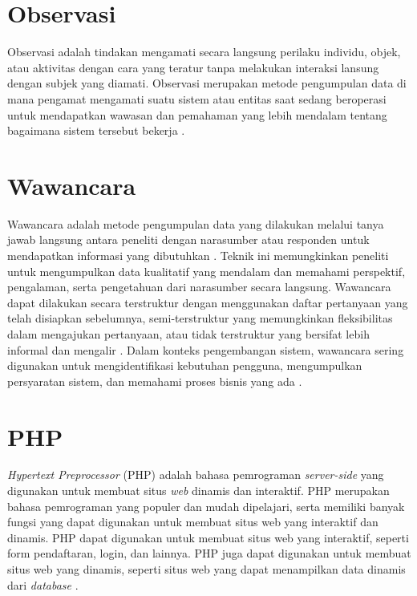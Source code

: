 \section{Observasi}
Observasi adalah tindakan mengamati secara langsung perilaku individu, objek, atau aktivitas dengan cara yang teratur tanpa melakukan interaksi lansung dengan subjek yang diamati. Observasi merupakan metode pengumpulan data di mana pengamat mengamati suatu sistem atau entitas saat sedang beroperasi untuk mendapatkan wawasan dan pemahaman yang lebih mendalam tentang bagaimana sistem tersebut bekerja \cite{tilley2017systems}.

\section{Wawancara}
Wawancara adalah metode pengumpulan data yang dilakukan melalui tanya jawab langsung antara peneliti dengan narasumber atau responden untuk mendapatkan informasi yang dibutuhkan \cite{monday2020impacts}. Teknik ini memungkinkan peneliti untuk mengumpulkan data kualitatif yang mendalam dan memahami perspektif, pengalaman, serta pengetahuan dari narasumber secara langsung. Wawancara dapat dilakukan secara terstruktur dengan menggunakan daftar pertanyaan yang telah disiapkan sebelumnya, semi-terstruktur yang memungkinkan fleksibilitas dalam mengajukan pertanyaan, atau tidak terstruktur yang bersifat lebih informal dan mengalir \cite{balza2022effective}. Dalam konteks pengembangan sistem, wawancara sering digunakan untuk mengidentifikasi kebutuhan pengguna, mengumpulkan persyaratan sistem, dan memahami proses bisnis yang ada \cite{rueda2020requirements}.

\section{PHP}
\textit{Hypertext Preprocessor} (PHP) adalah bahasa pemrograman \textit{server-side} yang digunakan untuk membuat situs \textit{web} dinamis dan interaktif. PHP merupakan bahasa pemrograman yang populer dan mudah dipelajari, serta memiliki banyak fungsi yang dapat digunakan untuk membuat situs web yang interaktif dan dinamis. PHP dapat digunakan untuk membuat situs web yang interaktif, seperti form pendaftaran, login, dan lainnya. PHP juga dapat digunakan untuk membuat situs web yang dinamis, seperti situs web yang dapat menampilkan data dinamis dari \textit{database} \cite{Cowls2021ADB}.


